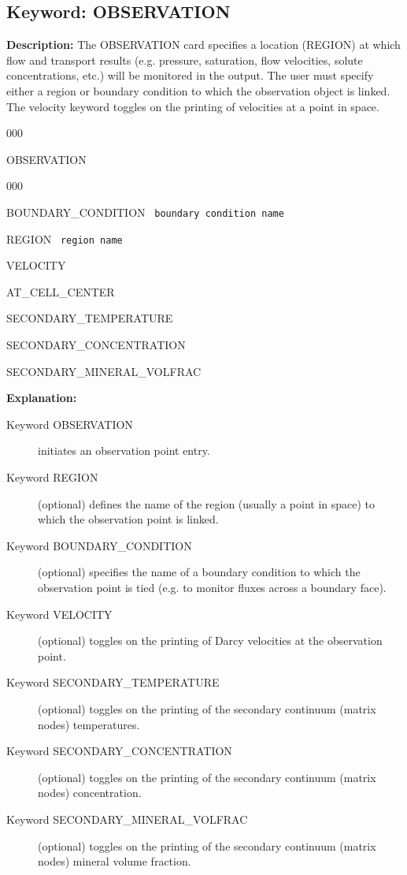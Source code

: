 \newpage
\protect\hypertarget{target_observation}{}

\subsection{Keyword: OBSERVATION}

{\noindent\bf Description:}
The OBSERVATION card specifies a location (REGION) at which flow and transport results (e.g. pressure, saturation, flow velocities, solute concentrations, etc.) will be monitored in the output.
The user must specify either a region or boundary condition to which the observation object is linked.  The velocity keyword toggles on the printing of velocities at a point in space.

\begin{deflist}{000}
\item[OBSERVATION] ~
\begin{deflist}{000}
\item[BOUNDARY\_CONDITION] \ {\tt boundary condition name}
\item[REGION] \ {\tt region name}
\item[VELOCITY]
\item[AT\_CELL\_CENTER]
\item[SECONDARY\_TEMPERATURE]
\item[SECONDARY\_CONCENTRATION]
\item[SECONDARY\_MINERAL\_VOLFRAC]
\end{deflist}
\item[\keyend]
\end{deflist}

{\noindent\bf Explanation:}
\begin{description}
\item[Keyword OBSERVATION] initiates an observation point entry.
\item[Keyword REGION] (optional) defines the name of the region (usually a point in space) to which the observation point is linked.
\item[Keyword BOUNDARY\_CONDITION] (optional) specifies the name of a boundary condition to which the observation point is tied (e.g. to monitor fluxes across a boundary face).
\item[Keyword VELOCITY] (optional) toggles on the printing of Darcy velocities at the observation point.
\item[Keyword SECONDARY\_TEMPERATURE] (optional) toggles on the printing of the secondary continuum (matrix nodes) temperatures.
\item[Keyword SECONDARY\_CONCENTRATION] (optional) toggles on the printing of the secondary continuum (matrix nodes) concentration.
\item[Keyword SECONDARY\_MINERAL\_VOLFRAC] (optional) toggles on the printing of the secondary continuum (matrix nodes) mineral volume fraction.
\end{description}

